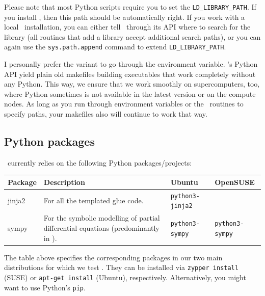 \noindent
Please note that most Python scripts require you to set the
\texttt{LD\_LIBRARY\_PATH}. 
If you install \Peano, then this path should be automatically right.
If you work with a local \Peano\ installation, you can either tell \Peano\
through its API where to search for the library (all routines that add a
library accept additional search paths), or you can again use the
\texttt{sys.path.append} command to extend \texttt{LD\_LIBRARY\_PATH}.


\begin{remark}
 I personally prefer the variant to go through the environment variable.
 \Peano's Python API yield plain old makefiles building executables that work
 completely without any Python. 
 This way, we ensure that we work smoothly on supercomputers, too, where Python
 sometimes is not available in the latest version or on the compute nodes.
 As long as you run through environment variables or the \Peano\ routines to
 specify paths, your makefiles also will continue to work that way. 
\end{remark}


\subsection{Python packages}

\Peano\ currently relies on the following Python packages/projects:


\begin{center}
 \begin{tabular}{lp{6cm}ll}\\
   Package & Description & Ubuntu & OpenSUSE \\
   \hline
   jinja2 & For all the templated glue code. & 
    \texttt{python3-jinja2} &
    \texttt{} 
    \\
   sympy & For the symbolic modelling of partial differential equations
    (predominantly in \ExaHyPE). &
    \texttt{python3-sympy} &
    \texttt{python3-sympy} 
 \end{tabular}
\end{center}


\noindent
The table above specifies the corresponding packages in our two main
distributions for which we test \Peano. 
They can be installed via \texttt{zypper install} (SUSE) or \texttt{apt-get
install} (Ubuntu), respectively.
Alternatively, you might want to use Python's \texttt{pip}.





